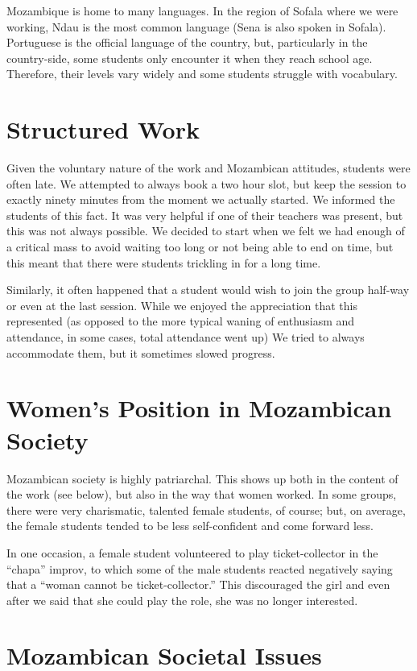 \documentclass[article,twocolumn,twoside]{memoir}
\begin{document}
Mozambique is home to many languages. In the region of Sofala where we were
working, Ndau is the most common language (Sena is also spoken in Sofala).
Portuguese is the official language of the country, but, particularly in the
country-side, some students only encounter it when they reach school age.
Therefore, their levels vary widely and some students struggle with vocabulary.

\section{Structured Work}

Given the voluntary nature of the work and Mozambican attitudes, students were
often late. We attempted to always book a two hour slot, but keep the session
to exactly ninety minutes from the moment we actually started. We informed the
students of this fact. It was very helpful if one of their teachers was
present, but this was not always possible. We decided to start when we felt we
had enough of a critical mass to avoid waiting too long or not being able to
end on time, but this meant that there were students trickling in for a long
time.

Similarly, it often happened that a student would wish to join the group
half-way or even at the last session. While we enjoyed the appreciation that
this represented (as opposed to the more typical waning of enthusiasm and
attendance, in some cases, total attendance went up) We tried to always
accommodate them, but it sometimes slowed progress.

\section{Women's Position in Mozambican Society}

Mozambican society is highly patriarchal. This shows up both in the content
of the work (see below), but also in the way that women worked. In some groups,
there were very charismatic, talented female students, of course; but, on
average, the female students tended to be less self-confident and come forward
less.

In one occasion, a female student volunteered to play ticket-collector in the
``chapa'' improv, to which some of the male students reacted negatively saying
that a ``woman cannot be ticket-collector.'' This discouraged the girl and even
after we said that she could play the role, she was no longer interested.

\section{Mozambican Societal Issues}
\end{document}
